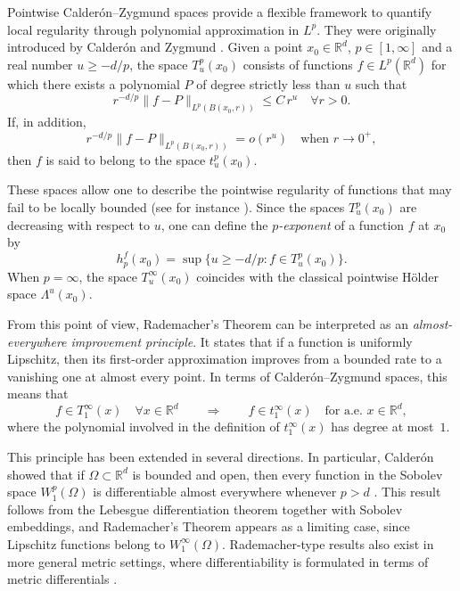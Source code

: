 \documentclass[a4paper,10pt]{article}
\theoremstyle{thmstyleone}%
\theoremstyle{thmstyletwo}%
\theoremstyle{thmstylethree}%
\begin{document}
Pointwise Calder\'on--Zygmund spaces provide a flexible framework to quantify local regularity through polynomial approximation in $L^p$. They were originally introduced by Calder\'on and Zygmund \cite{Calderon:61}. Given a point $x_0 \in \mathbb{R}^d$, $p \in [1,\infty]$ and a real number $u \geq -d/p$, the space $T^p_u(x_0)$ consists of functions $f \in L^p(\mathbb{R}^d)$ for which there exists a polynomial $P$ of degree strictly less than $u$ such that
\begin{equation}\label{equa Tpu}
r^{-d/p}\|f-P\|_{L^p(B(x_0,r))}\leq C\,r^u \quad \forall r>0.
\end{equation}
If, in addition,
\begin{equation}\label{equa tpu}
r^{-d/p}\|f-P\|_{L^p(B(x_0,r))}=o(r^u) \quad \text{when } r\rightarrow 0^+,
\end{equation}
then $f$ is said to belong to the space $t^p_u(x_0)$.

These spaces allow one to describe the pointwise regularity of functions that may fail to be locally bounded (see for instance \cite{Jaffard:18,Seuret:17,Lamby:21}). Since the spaces $T^p_u(x_0)$ are decreasing with respect to $u$, one can define the \emph{$p$-exponent} of a function $f$ at $x_0$ by
\[
h_p^f(x_0)=\sup\{u\geq -d/p : f\in T^p_u(x_0)\}.
\]
When $p=\infty$, the space $T^\infty_u(x_0)$ coincides with the classical pointwise H\"older space $\Lambda^u(x_0)$.

\medskip

From this point of view, Rademacher's Theorem can be interpreted as an \emph{almost-everywhere improvement principle}. It states that if a function is uniformly Lipschitz, then its first-order approximation improves from a bounded rate to a vanishing one at almost every point. In terms of Calder\'on--Zygmund spaces, this means that
\[
f \in T^\infty_1(x) \quad \forall x \in \mathbb{R}^d
\qquad \Longrightarrow \qquad
f \in t^\infty_1(x) \quad \text{for a.e. } x \in \mathbb{R}^d,
\]
where the polynomial involved in the definition of $t^\infty_1(x)$ has degree at most~$1$.

This principle has been extended in several directions. In particular, Calder\'on showed that if $\Omega \subset \mathbb{R}^d$ is bounded and open, then every function in the Sobolev space $W^p_1(\Omega)$ is differentiable almost everywhere whenever $p>d$ \cite{Evans:15}. This result follows from the Lebesgue differentiation theorem together with Sobolev embeddings, and Rademacher's Theorem appears as a limiting case, since Lipschitz functions belong to $W^\infty_1(\Omega)$. Rademacher-type results also exist in more general metric settings, where differentiability is formulated in terms of metric differentials \cite{Cheeger:99}.
\end{document}
